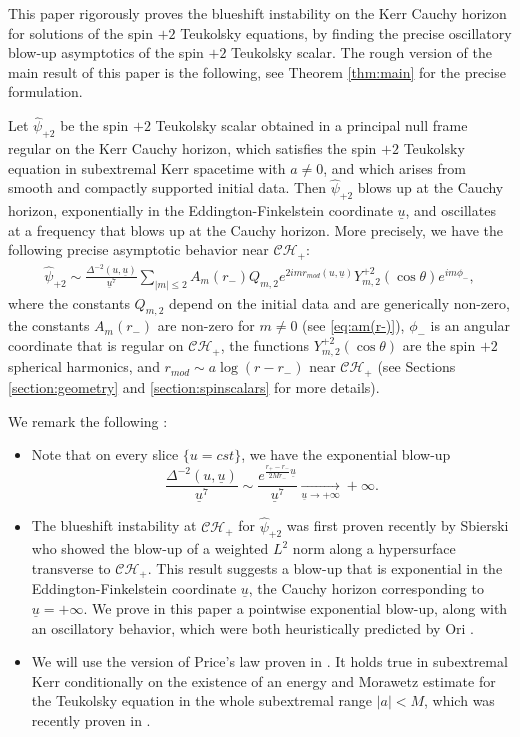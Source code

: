 \documentclass[reqno]{amsart}
\numberwithin{equation}{section}
\newcommand{\ubar}{{\underline{u}}}
\newcommand{\ch}{\mathcal{CH_+}}
\newcommand{\psihat}{\widehat{\psi}}
\newcommand{\psihatp}{\psihat_{+2}}
\theoremstyle{plain}
\theoremstyle{definition}
\theoremstyle{remark}
\numberwithin{equation}{section}
\begin{document}
This paper rigorously proves the  blueshift instability on the Kerr Cauchy horizon for solutions of the spin $+2$ Teukolsky equations, by finding the precise oscillatory blow-up asymptotics of the spin $+2$ Teukolsky scalar. The rough version of the main result of this paper is the following, see Theorem \ref{thm:main} for the precise formulation.
{
\begin{thm} Let $\psihatp$ be the spin $+2$ Teukolsky scalar obtained in a principal null frame regular on the Kerr Cauchy horizon, which satisfies the spin $+2$ Teukolsky equation in subextremal Kerr spacetime with $a\neq 0$, and which arises from smooth and compactly supported initial data. Then $\psihatp$ blows up at the Cauchy horizon, exponentially in the Eddington-Finkelstein coordinate $\ubar$, and oscillates at a frequency that blows up at the Cauchy horizon. More precisely, we have the following precise asymptotic behavior near $\ch$:
\begin{align}\label{eqn:asympt}
    \psihatp\sim\frac{\Delta^{-2}(u,\ubar)}{\ubar^7}\sum_{|m|\leq 2}A_m(r_-)Q_{m,2}e^{2imr_{mod}(u,\ubar)}Y_{m,2}^{+2}(\cos\theta)e^{im\phi_{-}},
\end{align}
        where the constants $Q_{m,2}$ depend on the initial data and are generically non-zero, the constants $A_m(r_-)$ are non-zero for $m\neq 0$ (see \eqref{eq:am(r-)}), $\phi_{-}$ is an angular coordinate that is regular on $\ch$, the functions $Y_{m,2}^{+2}(\cos\theta)$ are the spin $+2$ spherical harmonics, and $r_{mod}\sim a\log(r-r_-)$ near $\ch$ (see Sections \ref{section:geometry} and \ref{section:spinscalars} for more details).
\end{thm}}
\begin{rem} We remark the following :
\begin{itemize}
        \item {Note that on every slice $\{u=cst\}$, we have the exponential blow-up
        $$\frac{\Delta^{-2}(u,\ubar)}{\ubar^7}\sim\frac{e^{\frac{r_+-r_-}{2Mr_-}\ubar}}{\ubar^7}\underset{\ubar\to+\infty}{\longrightarrow}+\infty.$$}
        \item The blueshift instability at $\ch$ for $\psihatp$ was first proven recently by Sbierski \cite{sbierski} who showed the blow-up of a weighted $L^2$ norm along a hypersurface transverse to $\ch$. This result suggests a blow-up that is exponential in the Eddington-Finkelstein coordinate $\ubar$, the Cauchy horizon corresponding to $\ubar=+\infty$. We prove in this paper a pointwise exponential blow-up, along with an oscillatory behavior, which were both heuristically predicted by Ori \cite{ori}.
        \item We will use the version of Price's law proven in \cite{pricelaw}. It holds true in subextremal Kerr conditionally on the existence of an energy and Morawetz estimate for the Teukolsky equation in the whole subextremal range $|a|<M$, which was recently proven in \cite{TDCSR2, TDCSR1}.
\end{itemize}


\end{rem}
\end{document}
